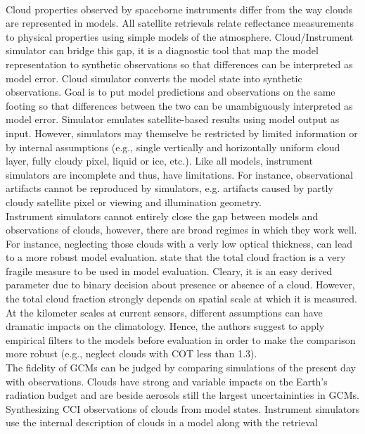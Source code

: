 \cite{Pincus2012}\\
Cloud properties observed by spaceborne instruments differ from the way clouds are represented in models.
All satellite retrievals relate reflectance measurements to physical properties using simple models of the atmosphere.
Cloud/Instrument simulator can bridge this gap, it is a diagnostic tool that map the model representation
to synthetic observations so that differences can be interpreted as model error.
Cloud simulator converts the model state into synthetic observations.
Goal is to put model predictions and observations on the same footing so that differences
between the two can be unambiguously interpreted as model error.
Simulator emulates satellite-based results using model output as input.
However, simulators may themselve be restricted by limited information or by internal assumptions 
(e.g., single vertically and horizontally uniform cloud layer, fully cloudy pixel, liquid or ice, etc.).
Like all models, instrument simulators are incomplete and thus, have limitations.
For instance, observational artifacts cannot be reproduced by simulators, e.g.
artifacts caused by partly cloudy satellite pixel or viewing and illumination geometry.\\
Instrument simulators cannot entirely close the gap between models and observations of clouds, however,
there are broad regimes in which they work well.
For instance, neglecting those clouds with a verly low optical thickness, can lead to a more robust model
evaluation. 
\cite{Pincus2012} state that the total cloud fraction is a very fragile measure to be used in model
evaluation. Cleary, it is an easy derived parameter due to binary decision about presence or absence of
a cloud. However, the total cloud fraction strongly depends on spatial scale at which it is measured.
At the kilometer scales at current sensors, different assumptions can have dramatic impacts on the climatology.
Hence, the authors suggest to apply empirical filters to the models before evaluation in order to make the
comparison more robust (e.g., neglect clouds with COT less than 1.3).\\
The fidelity of GCMs can be judged by comparing simulations of the present day with observations.
Clouds have strong and variable impacts on the Earth's radiation budget and
are beside aerosols still the largest uncertaininties in GCMs.\\
Synthesizing CCI observations of clouds from model states.
Instrument simulators use the internal description of clouds in a model along with the retrieval
